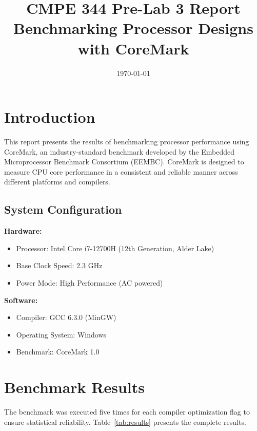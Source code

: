 \documentclass[11pt,a4paper]{article}
\title{\textbf{CMPE 344 Pre-Lab 3 Report} \\ Benchmarking Processor Designs with CoreMark}
\date{\today}
\begin{document}
\maketitle

\section{Introduction}
This report presents the results of benchmarking processor performance using CoreMark, an industry-standard benchmark developed by the Embedded Microprocessor Benchmark Consortium (EEMBC). CoreMark is designed to measure CPU core performance in a consistent and reliable manner across different platforms and compilers.

\subsection{System Configuration}
\textbf{Hardware:}
\begin{itemize}
    \item Processor: Intel Core i7-12700H (12th Generation, Alder Lake)
    \item Base Clock Speed: 2.3 GHz
    \item Power Mode: High Performance (AC powered)
\end{itemize}

\textbf{Software:}
\begin{itemize}
    \item Compiler: GCC 6.3.0 (MinGW)
    \item Operating System: Windows
    \item Benchmark: CoreMark 1.0
\end{itemize}

\section{Benchmark Results}

The benchmark was executed five times for each compiler optimization flag to ensure statistical reliability. Table~\ref{tab:results} presents the complete results.
\end{document}
